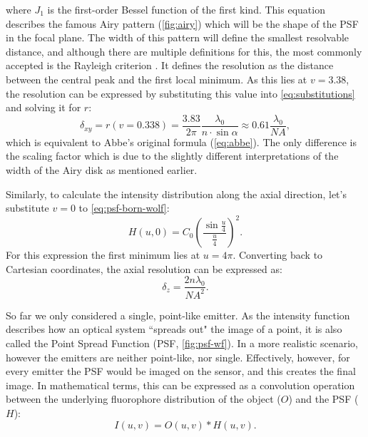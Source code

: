     

    where $J_1$ is the first-order Bessel function of the first kind.
    This equation describes the famous Airy pattern (\autoref{fig:airy}) which will be the shape of the PSF in the focal plane. The width of this pattern will define the smallest resolvable distance, and although there are multiple definitions for this, the most commonly accepted is the Rayleigh criterion \cite{f.r.s_xxxi._1879, born_principles_2013}. It defines the resolution as the distance between the central peak and the first local minimum. As this lies at $v=3.38$, the resolution can be expressed by substituting this value into \autoref{eq:substitutions} and solving it for $r$:
    \begin{equation}
      \delta_{xy} = r(v=0.338) = \frac{3.83}{2\pi} \frac{\lambda_0}{n\cdot \sin \alpha} \approx 0.61 \frac{\lambda_0}{NA},
      \label{eq:lateralRes}
    \end{equation}
    which is equivalent to Abbe's original formula (\autoref{eq:abbe}). The only difference is the scaling factor which is due to the slightly different interpretations of the width of the Airy disk as mentioned earlier.

    Similarly, to calculate the intensity distribution along the axial direction, let's substitute $v=0$ to \autoref{eq:psf-born-wolf}:
    \begin{equation}
      H(u,0)=C_0\left( \frac{\sin \frac{u}{4}}{\frac{u}{4}}\right) ^2 . 
    \end{equation} 
    For this expression the first minimum lies at $u=4\pi$. Converting back to Cartesian coordinates, the axial resolution can be expressed as:
    \begin{equation}
      \delta_z = \frac{2n\lambda_0}{NA^2}.
      \label{eq:axialRes}
    \end{equation}

    So far we only considered a single, point-like emitter. As the intensity function describes how an optical system ``spreads out" the image of a point, it is also called the Point Spread Function (PSF, \autoref{fig:psf-wf}). In a more realistic scenario, however the emitters are neither point-like, nor single. Effectively, however, for every emitter the PSF would be imaged on the sensor, and this creates the final image. In mathematical terms, this can be expressed as a convolution operation between the underlying fluorophore distribution of the object ($O$) and the PSF ($H$):
    \begin{equation}
      I(u,v) = O(u,v) * H(u,v).
    \end{equation}

